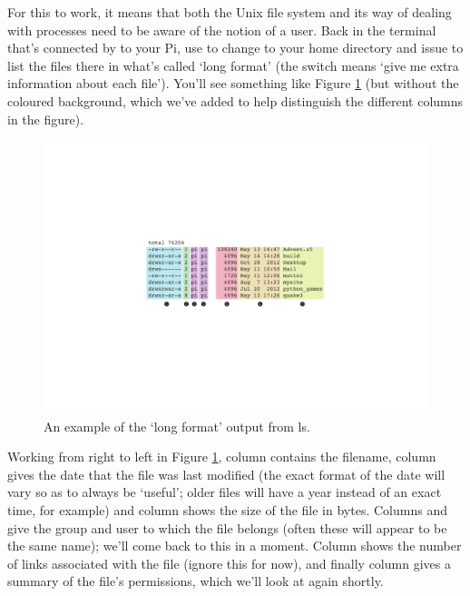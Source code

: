 For this to work, it means that both the Unix file system and its way of dealing with processes need to be aware of the notion of a user. Back in the terminal that's connected by  to your Pi, use  to change to your home directory and issue  to list the files there in what's called `long format' (the  switch means `give me extra information about each file'). You'll see something like Figure \ref{figure:longformls} (but without the coloured background, which we've added to help distinguish the different columns in the figure).

\begin{figure}
\centerline{\includegraphics[width=14cm]{images/longformls}}
\caption{An example of the `long format' output from ls.}\label{figure:longformls}
\end{figure}

Working from right to left in Figure \ref{figure:longformls}, column \protect{} contains the filename, column \protect{} gives the date that the file was last modified (the exact format of the date will vary so as to always be `useful'; older files will have a year instead of an exact time, for example) and column \protect{} shows the size of the file in bytes. Columns \protect{} and \protect{} give the group and user to which the file belongs (often these will appear to be the same name); we'll come back to this in a moment. Column \protect{} shows the number of links associated with the file (ignore this for now), and finally column \protect{} gives a summary of the file's permissions, which we'll look at again shortly. 

